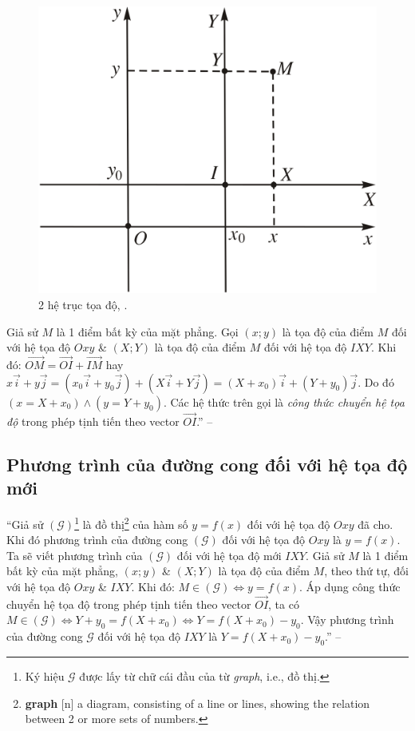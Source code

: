 \documentclass[oneside]{book}
\numberwithin{equation}{section}
\begin{document}
\begin{figure}[H]
	\centering
	\includegraphics[scale=0.13]{2_he_truc_toa_do}
	\caption{2 hệ trục tọa độ, \cite[Hình 1.5, p. 25]{SGK_Toan_12_giai_tich_nang_cao}.}
	\label{fig:2_he_truc_toa_do}
\end{figure}
Giả sử $M$ là 1 điểm bất kỳ của mặt phẳng. Gọi $(x;y)$ là tọa độ của điểm $M$ đối với hệ tọa độ $Oxy$ \& $(X;Y)$ là tọa độ của điểm $M$ đối với hệ tọa độ $IXY$. Khi đó: $\overrightarrow{OM} = \overrightarrow{OI} + \overrightarrow{IM}$ hay $x\vec{i} + y\vec{j} = (x_0\vec{i} + y_0\vec{j}) + (X\vec{i} + Y\vec{j}) = (X + x_0)\vec{i} + (Y + y_0)\vec{j}$. Do đó $(x = X + x_0)\land(y = Y + y_0)$. Các hệ thức trên gọi là \textit{công thức chuyển hệ tọa độ} trong phép tịnh tiến theo vector $\overrightarrow{OI}$.'' -- \cite[p. 25]{SGK_Toan_12_giai_tich_nang_cao}

\subsection{Phương trình của đường cong đối với hệ tọa độ mới}
``Giả sử $(\mathcal{G})$\footnote{Ký hiệu $\mathcal{G}$ được lấy từ chữ cái đầu của từ \textit{graph}, i.e., đồ thị.} là đồ thị\footnote{\textbf{graph} [n] a diagram, consisting of a line or lines, showing the relation between 2 or more sets of numbers.} của hàm số $y = f(x)$ đối với hệ tọa độ $Oxy$ đã cho. Khi đó phương trình của đường cong $(\mathcal{G})$ đối với hệ tọa độ $Oxy$ là $y = f(x)$. Ta sẽ viết phương trình của $(\mathcal{G})$ đối với hệ tọa độ mới $IXY$. Giả sử $M$ là 1 điểm bất kỳ của mặt phẳng, $(x;y)$ \& $(X;Y)$ là tọa độ của điểm $M$, theo thứ tự, đối với hệ tọa độ $Oxy$ \& $IXY$. Khi đó: $M\in(\mathcal{G})\Leftrightarrow y = f(x)$. Áp dụng công thức chuyển hệ tọa độ trong phép tịnh tiến theo vector $\overrightarrow{OI}$, ta có $M\in(\mathcal{G})\Leftrightarrow Y + y_0 = f(X + x_0)\Leftrightarrow Y = f(X + x_0) - y_0$. Vậy phương trình của đường cong $\mathcal{G}$ đối với hệ tọa độ $IXY$ là $Y = f(X + x_0) - y_0$.'' -- \cite[pp. 25--26]{SGK_Toan_12_giai_tich_nang_cao}
\end{document}
